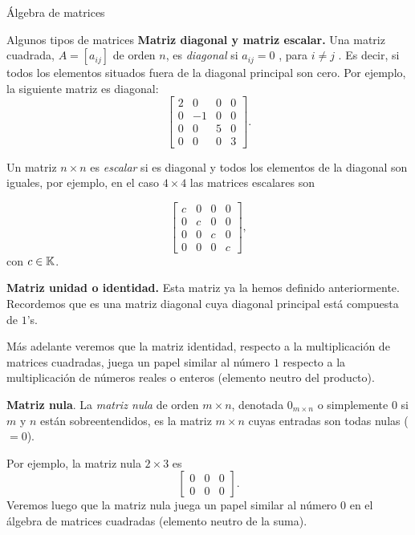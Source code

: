 \begin{chapter}{\'Algebra de matrices}
\begin{section}{Algunos tipos de matrices}
                \textbf{Matriz diagonal y matriz escalar.} Una matriz cuadrada, $A=[a_{ij}]$ de orden $n$, es \textit{diagonal} si $a_{ij}  =0$ , para $i \not= j$ . Es decir, si todos los elementos situados fuera de la diagonal principal son cero. Por ejemplo, la siguiente matriz es diagonal:
                \begin{equation}
                \begin{bmatrix}
                2&0&0&0\\0&-1&0&0\\0&0&5&0\\0&0&0&3
                \end{bmatrix}.
                \end{equation}
                
                Un matriz $n \times n$  es \textit{escalar} si  es diagonal y todos los elementos de la diagonal son iguales, por ejemplo, en el caso $4 \times 4$ las matrices escalares son 
                
                \begin{equation}
                \begin{bmatrix}
                c&0&0&0\\0&c&0&0\\0&0&c&0\\0&0&0&c
                \end{bmatrix},
                \end{equation}
                con $c \in \mathbb K$.
                
                \textbf{Matriz unidad o identidad.} Esta matriz ya la hemos definido anteriormente. Recordemos que es una matriz diagonal cuya diagonal principal está compuesta de $1$'s. 
                
                Más adelante veremos que la matriz identidad, respecto a la multiplicación de matrices cuadradas, juega un papel similar al número $1$ respecto a la multiplicación de números reales o enteros (elemento neutro del producto).
                
                \textbf{Matriz nula}. La \textit{matriz nula} de orden $m\times n$, denotada $0_{m \times n}$ o simplemente $0$ si $m$ y $n$ están sobreentendidos,  es la  matriz $m \times n$ cuyas entradas son todas nulas ($=0$). 
                
                Por ejemplo, la matriz nula $2 \times 3$ es
                \begin{equation*}
                \begin{bmatrix} 0&0&0\\ 0&0&0\end{bmatrix}.
                \end{equation*}
                Veremos luego que la matriz nula juega un papel similar al número $0$ en el álgebra de matrices cuadradas (elemento neutro de la suma).  
                

\end{section}
\end{chapter}
